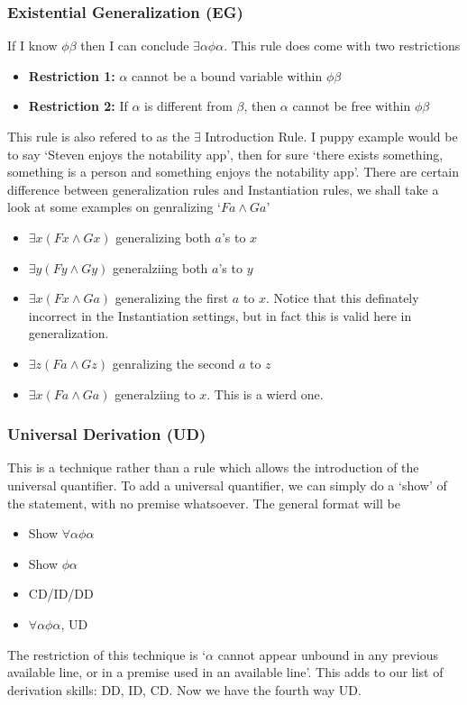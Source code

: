 \documentclass[10pt]{article}
\begin{document}
\subsubsection{Existential Generalization (EG)}
If I know $\phi \beta$ then I can conclude $\exists \alpha \phi \alpha$. This rule does come with two restrictions
\begin{itemize}
    \item \textbf{Restriction 1:} $\alpha$ cannot be a bound variable within $\phi \beta$
    \item \textbf{Restriction 2:} If $\alpha $ is different from $\beta$, then $\alpha$ cannot be free within $\phi \beta$
\end{itemize}
This rule is also refered to as the $\exists$ Introduction Rule. I puppy example would be to say `Steven enjoys the notability app', then for sure `there exists something, something is a person and something enjoys the notability app'. There are certain difference between generalization rules and Instantiation rules, we shall take a look at some examples on genralizing `$Fa\wedge Ga$'
\begin{itemize}
    \item $\exists x(Fx \wedge Gx)$ generalizing both $a$'s to $x$
    \item $\exists y(Fy \wedge Gy)$ generalziing both $a$'s to $y$
    \item $\exists x(Fx \wedge Ga)$ generalizing the first $a$ to $x$. Notice that this definately incorrect in the Instantiation settings, but in fact this is valid here in generalization. 
    \item $\exists z(Fa \wedge Gz)$ genralizing the second $a$ to $z$
    \item $\exists x (Fa \wedge Ga)$ generalziing to $x$. This is a wierd one.
\end{itemize}

\subsubsection{Universal Derivation (UD)} This is a technique rather than a rule which allows the introduction of the universal quantifier. To add a universal quantifier, we can simply do a `show' of the statement, with no premise whatsoever. The general format will be
\begin{itemize}
    \item Show $\forall \alpha \phi \alpha$
    \item \quad Show $\phi \alpha$
    \item \quad CD/ID/DD 
    \item $\forall \alpha\phi \alpha$, UD
\end{itemize}
The restriction of this technique is `$\alpha$ cannot appear unbound in any previous available line, or in a premise used in an available line'. This adds to our list of derivation skills: DD, ID, CD. Now we have the fourth way UD. 
\end{document}
